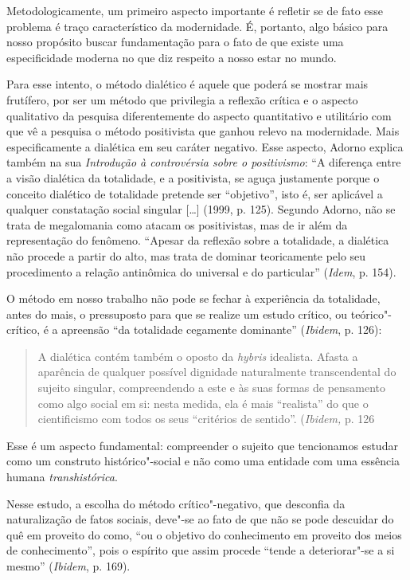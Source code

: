 Metodologicamente, um primeiro aspecto importante é refletir se de fato
esse problema é traço característico da modernidade. É, portanto, algo
básico para nosso propósito buscar fundamentação para o fato de que
existe uma especificidade moderna no que diz respeito a nosso estar no
mundo.

Para esse intento, o método dialético é aquele que poderá se mostrar
mais frutífero, por ser um método que privilegia a reflexão crítica e o
aspecto qualitativo da pesquisa diferentemente do aspecto quantitativo e
utilitário com que vê a pesquisa o método positivista que ganhou relevo
na modernidade. Mais especificamente a dialética em seu caráter
negativo. Esse aspecto, Adorno explica também na sua \emph{Introdução à
controvérsia sobre o positivismo}: ``A diferença entre a visão dialética
da totalidade, e a positivista, se aguça justamente porque o conceito
dialético de totalidade pretende ser ``objetivo'', isto é, ser aplicável
a qualquer constatação social singular [\ldots{}] (1999, p. 125).
Segundo Adorno, não se trata de megalomania como atacam os positivistas,
mas de ir além da representação do fenômeno. ``Apesar da reflexão sobre
a totalidade, a dialética não procede a partir do alto, mas trata de
dominar teoricamente pelo seu procedimento a relação antinômica do
universal e do particular'' (\emph{Idem}, p. 154).

O método em nosso trabalho não pode se fechar à experiência da
totalidade, antes do mais, o pressuposto para que se realize um estudo
crítico, ou teórico"-crítico, é a apreensão ``da totalidade cegamente
dominante'' (\emph{Ibidem}, p. 126):

\begin{quote}
A dialética contém também o oposto da \emph{hybris} idealista. Afasta a
aparência de qualquer possível dignidade naturalmente transcendental do
sujeito singular, compreendendo a este e às suas formas de pensamento
como algo social em si: nesta medida, ela é mais ``realista'' do que o
cientificismo com todos os seus ``critérios de sentido''.
(\emph{Ibidem,} p. 126
\end{quote}

Esse é um aspecto fundamental: compreender o sujeito que tencionamos
estudar como um construto histórico"-social e não como uma entidade com
uma essência humana \emph{transhistórica}.

Nesse estudo, a escolha do método crítico"-negativo, que desconfia da
naturalização de fatos sociais, deve"-se ao fato de que não se pode
descuidar do quê em proveito do como, ``ou o objetivo do conhecimento em
proveito dos meios de conhecimento'', pois o espírito que assim procede
``tende a deteriorar"-se a si mesmo'' (\emph{Ibidem}, p. 169).

